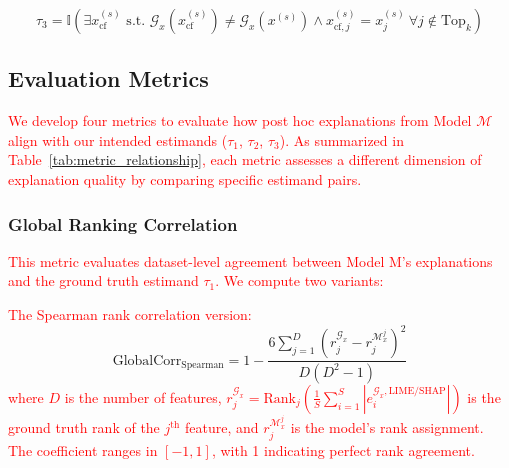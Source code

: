 \begin{equation}
    \tau_3 = \mathbb{I}\left(\exists x_{\text{cf}}^{(s)} \text{ s.t. } \mathcal{G}_x(x_{\text{cf}}^{(s)}) \neq \mathcal{G}_x(x^{(s)}) \land x_{\text{cf},j}^{(s)} = x_j^{(s)}\ \forall j \notin \text{Top}_k\right)
\end{equation}

\subsection{Evaluation Metrics}
\label{sec:metrics}

\textcolor{red}{We develop four metrics to evaluate how post hoc explanations from Model $\mathcal{M}$ align with our intended estimands ($\tau_1$, $\tau_2$, $\tau_3$). As summarized in Table~\ref{tab:metric_relationship}, each metric assesses a different dimension of explanation quality by comparing specific estimand pairs.}

\subsubsection*{Global Ranking Correlation}
\textcolor{red}{This metric evaluates dataset-level agreement between Model M's explanations and the ground truth estimand $\tau_1$. We compute two variants:}

\textcolor{red}{The Spearman rank correlation version:}
\begin{equation}
\text{GlobalCorr}_{\text{Spearman}} = 1 - \frac{6\sum_{j=1}^D (r^{\mathcal{G}_x}_j - r^{\mathcal{M}_x^j}_j)^2}{D(D^2-1)}
\end{equation}
\textcolor{red}{where $D$ is the number of features, $r^{\mathcal{G}_x}_j = \text{Rank}_j(\frac{1}{S}\sum_{i=1}^S |e_i^{\mathcal{G}_x,\text{LIME/SHAP}}|)$ is the ground truth rank of the $j^{\text{th}}$ feature, and $r^{\mathcal{M}_x^j}_j$ is the model's rank assignment. The coefficient ranges in $[-1,1]$, with 1 indicating perfect rank agreement.}

